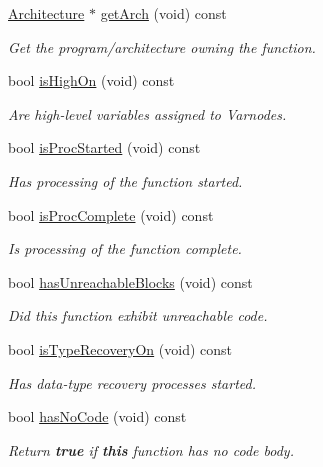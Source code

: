 \begin{DoxyCompactItemize}
\mbox{\hyperlink{class_architecture}{Architecture}} $\ast$ \mbox{\hyperlink{class_funcdata_a47b9d753da3c1caf025981ced51c1e96}{get\+Arch}} (void) const
\begin{DoxyCompactList}\small\item\em Get the program/architecture owning the function. \end{DoxyCompactList}\item 
bool \mbox{\hyperlink{class_funcdata_a624dc32b7a1a0563bae734de63378139}{is\+High\+On}} (void) const
\begin{DoxyCompactList}\small\item\em Are high-\/level variables assigned to Varnodes. \end{DoxyCompactList}\item 
bool \mbox{\hyperlink{class_funcdata_aecb26084299205063c0a3d37ddfcc54f}{is\+Proc\+Started}} (void) const
\begin{DoxyCompactList}\small\item\em Has processing of the function started. \end{DoxyCompactList}\item 
bool \mbox{\hyperlink{class_funcdata_ac67b670f722fcb5aa113746f972ab1b7}{is\+Proc\+Complete}} (void) const
\begin{DoxyCompactList}\small\item\em Is processing of the function complete. \end{DoxyCompactList}\item 
bool \mbox{\hyperlink{class_funcdata_ae7daf83122a6a2ffff93774466baab26}{has\+Unreachable\+Blocks}} (void) const
\begin{DoxyCompactList}\small\item\em Did this function exhibit unreachable code. \end{DoxyCompactList}\item 
bool \mbox{\hyperlink{class_funcdata_ad1ddd307891ab537b02195847a5c0cd5}{is\+Type\+Recovery\+On}} (void) const
\begin{DoxyCompactList}\small\item\em Has data-\/type recovery processes started. \end{DoxyCompactList}\item 
bool \mbox{\hyperlink{class_funcdata_aca7d46a9a41bb6057d2ad5334103ebb9}{has\+No\+Code}} (void) const
\begin{DoxyCompactList}\small\item\em Return {\bfseries{true}} if {\bfseries{this}} function has no code body. \end{DoxyCompactList}\item 

\end{DoxyCompactItemize}

